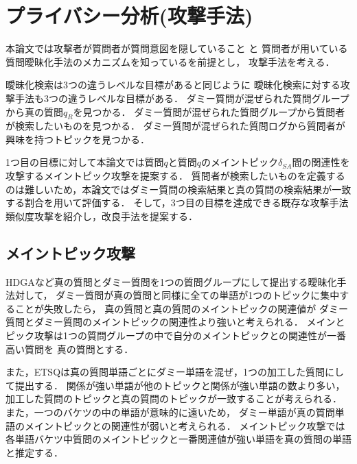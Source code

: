 \documentclass[master]{suribt}
\theoremstyle{definition}
\newcommand{\argmax}{\mathop{\rm argmax}\limits}
\begin{document}
 \chapter{プライバシー分析(攻撃手法)}
 本論文では攻撃者が質問者が質問意図を隠していること
 と
 質問者が用いている質問曖昧化手法のメカニズムを知っているを前提とし，
 攻撃手法を考える．

 曖昧化検索は3つの違うレベルな目標があると同じように
 曖昧化検索に対する攻撃手法も3つの違うレベルな目標がある．
 ダミー質問が混ぜられた質問グループから真の質問$q_R$を見つかる．
 ダミー質問が混ぜられた質問グループから質問者が検索したいものを見つかる．
 ダミー質問が混ぜられた質問ログから質問者が興味を持つトピックを見つかる．

 1つ目の目標に対して本論文では質問$q$と質問$q$のメイントピック$\delta_{SA}$間の関連性を攻撃するメイントピック攻撃を提案する．
 質問者が検索したいものを定義するのは難しいため，本論文ではダミー質問の検索結果と真の質問の検索結果が一致する割合を用いて評価する．
 そして，3つ目の目標を達成できる既存な攻撃手法類似度攻撃\cite{simattack2016}を紹介し，改良手法を提案する．

 \section{メイントピック攻撃}
 HDGAなど真の質問とダミー質問を1つの質問グループにして提出する曖昧化手法対して，
 ダミー質問が真の質問と同様に全ての単語が1つのトピックに集中することが失敗したら，
 真の質問と真の質問のメイントピックの関連値が
 ダミー質問とダミー質問のメイントピックの関連性より強いと考えられる．
 メインとピック攻撃は1つの質問グループの中で自分のメイントピックとの関連性が一番高い質問を
 真の質問とする．

 また，ETSQは真の質問単語ごとにダミー単語を混ぜ，1つの加工した質問にして提出する．
 関係が強い単語が他のトピックと関係が強い単語の数より多い，
 加工した質問のトピックと真の質問のトピックが一致することが考えられる．
 また，一つのバケツの中の単語が意味的に遠いため，
 ダミー単語が真の質問単語のメイントピックとの関連性が弱いと考えられる．
 メイントピック攻撃では各単語バケツ中質問のメイントピックと一番関連値が強い単語を真の質問の単語と推定する．

\end{document}

